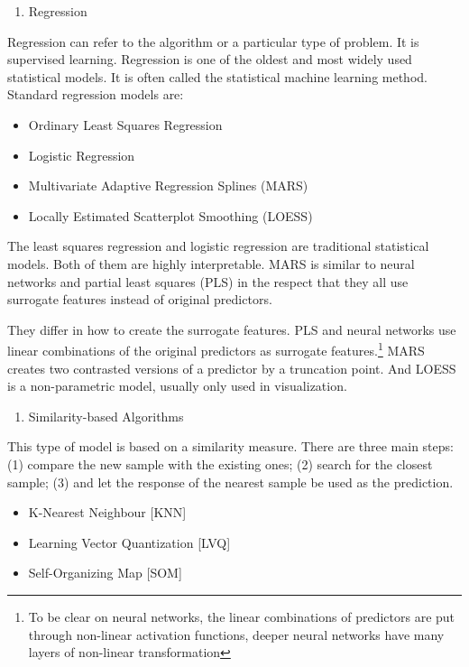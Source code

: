 \documentclass[
]{article}
\providecommand{\tightlist}{%
  \setlength{\itemsep}{0pt}\setlength{\parskip}{0pt}}
\begin{document}
\begin{enumerate}
\def\labelenumi{\arabic{enumi}.}
\tightlist
\item
  Regression
\end{enumerate}

Regression can refer to the algorithm or a particular type of problem.
It is supervised learning. Regression is one of the oldest and most
widely used statistical models. It is often called the statistical
machine learning method. Standard regression models are:

\begin{itemize}
\tightlist
\item
  Ordinary Least Squares Regression
\item
  Logistic Regression
\item
  Multivariate Adaptive Regression Splines (MARS)
\item
  Locally Estimated Scatterplot Smoothing (LOESS)
\end{itemize}

The least squares regression and logistic regression are traditional
statistical models. Both of them are highly interpretable. MARS is
similar to neural networks and partial least squares (PLS) in the
respect that they all use surrogate features instead of original
predictors.

They differ in how to create the surrogate features. PLS and neural
networks use linear combinations of the original predictors as surrogate
features.\footnote{To be clear on neural networks, the linear
  combinations of predictors are put through non-linear activation
  functions, deeper neural networks have many layers of non-linear
  transformation} MARS creates two contrasted versions of a predictor by
a truncation point. And LOESS is a non-parametric model, usually only
used in visualization.

\begin{enumerate}
\def\labelenumi{\arabic{enumi}.}
\setcounter{enumi}{1}
\tightlist
\item
  Similarity-based Algorithms
\end{enumerate}

This type of model is based on a similarity measure. There are three
main steps: (1) compare the new sample with the existing ones; (2)
search for the closest sample; (3) and let the response of the nearest
sample be used as the prediction.

\begin{itemize}
\tightlist
\item
  K-Nearest Neighbour {[}KNN{]}
\item
  Learning Vector Quantization {[}LVQ{]}
\item
  Self-Organizing Map {[}SOM{]}
\end{itemize}
\end{document}
